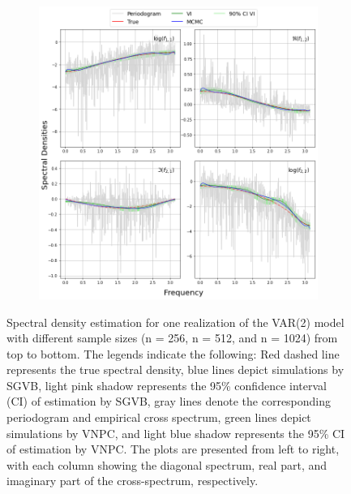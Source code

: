 \documentclass[12pt,a4paper]{article}
\begin{document}
\begin{figure}[H]
\begin{subfigure}{\textwidth} %
  \centering
  \includegraphics[width=18cm]{VMA(1) with length 1024 by variational inference and VNPC.png}
\end{subfigure}

\caption{Spectral density estimation for one realization of the VAR(2) model with different sample sizes (n = 256, n = 512, and n = 1024) from top to bottom. The legends indicate the following: Red dashed line represents the true spectral density, blue lines depict simulations by SGVB, light pink shadow represents the 95\% confidence interval (CI) of estimation by SGVB, gray lines denote the corresponding periodogram and empirical cross spectrum, green lines depict simulations by VNPC, and light blue shadow represents the 95\% CI of estimation by VNPC. The plots are presented from left to right, with each column showing the diagonal spectrum, real part, and imaginary part of the cross-spectrum, respectively.}
\label{vma1 plots}
\end{figure}
\end{document}

